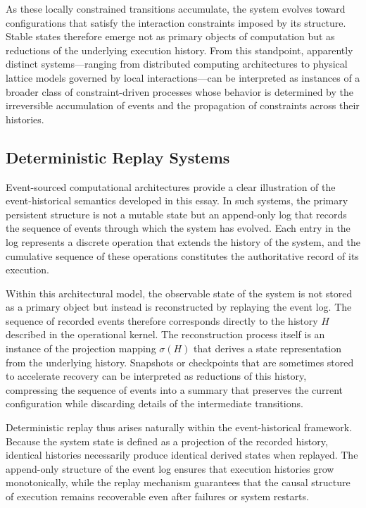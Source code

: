 \documentclass[12pt]{article}
\begin{document}
As these locally constrained transitions accumulate,
the system evolves toward configurations that satisfy
the interaction constraints imposed by its structure.
Stable states therefore emerge not as primary objects
of computation but as reductions of the underlying
execution history. From this standpoint, apparently
distinct systems—ranging from distributed computing
architectures to physical lattice models governed by
local interactions—can be interpreted as instances of
a broader class of constraint-driven processes whose
behavior is determined by the irreversible accumulation
of events and the propagation of constraints across
their histories.

\subsection{Deterministic Replay Systems}

Event-sourced computational architectures provide a clear
illustration of the event-historical semantics developed
in this essay. In such systems, the primary persistent
structure is not a mutable state but an append-only log
that records the sequence of events through which the
system has evolved. Each entry in the log represents a
discrete operation that extends the history of the system,
and the cumulative sequence of these operations constitutes
the authoritative record of its execution.

Within this architectural model, the observable state of
the system is not stored as a primary object but instead
is reconstructed by replaying the event log. The sequence
of recorded events therefore corresponds directly to the
history $H$ described in the operational kernel. The
reconstruction process itself is an instance of the
projection mapping $\sigma(H)$ that derives a state
representation from the underlying history. Snapshots
or checkpoints that are sometimes stored to accelerate
recovery can be interpreted as reductions of this history,
compressing the sequence of events into a summary that
preserves the current configuration while discarding
details of the intermediate transitions.

Deterministic replay thus arises naturally within the
event-historical framework. Because the system state is
defined as a projection of the recorded history, identical
histories necessarily produce identical derived states
when replayed. The append-only structure of the event log
ensures that execution histories grow monotonically, while
the replay mechanism guarantees that the causal structure
of execution remains recoverable even after failures or
system restarts.
\end{document}
